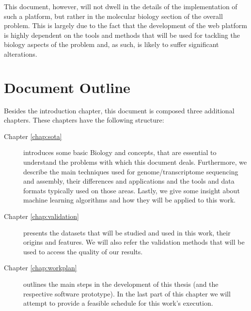 This document, however, will not dwell in the details of the implementation of
such a platform, but rather in the molecular biology section of the overall
problem. This is largely due to the fact that the development of the web
platform is highly dependent on the tools and methods that will be used for
tackling the biology aspects of the problem and, as such, is likely to suffer
significant alterations.

\section{Document Outline} \label{sec:outline}

Besides the introduction chapter, this document is composed three additional
chapters. These chapters have the following structure:

\begin{description}

  \item[Chapter \ref{chap:sota}]
  introduces some basic Biology and \rnaseq{} concepts, that are essential to
  understand the problems with which this document deals. Furthermore, we
  describe the main techniques used for genome/transcriptome sequencing and
  assembly, their differences and applications and the tools and data formats
  typically used on those areas. Lastly, we give some insight about machine
  learning algorithms and how they will be applied to this work.

  \item[Chapter \ref{chap:validation}]
  presents the datasets that will be studied and used in this work, their
  origins and features. We will also refer the validation methods that will
  be used to access the quality of our results.

  \item[Chapter \ref{chap:workplan}]
  outlines the main steps in the development of this thesis (and the respective
  software prototype). In the last part of this chapter we will attempt to
  provide a feasible schedule for this work's execution.

\end{description}
